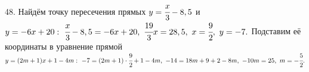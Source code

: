 48. Найдём точку пересечения прямых $y=\cfrac{x}{3}-8,5$ и $y=-6x+20:\ \cfrac{x}{3}-8,5=-6x+20,\ \cfrac{19}{3}x=28,5,\ x=\cfrac{9}{2},\ y=-7.$ Подставим её координаты в уравнение прямой $y=(2m+1)x+1-4m:\ -7=(2m+1)\cdot\cfrac{9}{2}+1-4m,\ -14=18m+9+2-8m,\ -10m=25,\ m=-\cfrac{5}{2}.$\\
